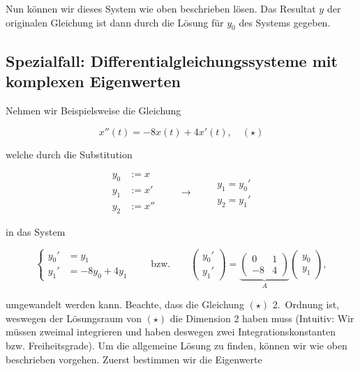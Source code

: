 Nun können wir dieses System wie oben beschrieben lösen. Das Resultat \( y \) der originalen Gleichung ist dann durch die Lösung für \( y_0 \) des Systems gegeben. 

\subsection{Spezialfall: Differentialgleichungssysteme mit komplexen Eigenwerten}

Nehmen wir Beispielsweise die Gleichung 

\begin{equation*}
    x''(t) = -8x(t) + 4x'(t), \quad (\star)
    \label{eq:lin_diff}
\end{equation*}

welche durch die Substitution

\begin{equation*}
    \begin{aligned}
        y_0 &:= x \\
        y_1 &:= x' \\
        y_2 &:= x''         
    \end{aligned} \qquad \longrightarrow \qquad
    \begin{aligned}
        y_1 = y_0' \\
        y_2 = y_1' 
    \end{aligned}
\end{equation*}

in das System 

\begin{equation*}
    \left\{ \begin{aligned}
        y_0' &= y_1 \\
        y_1' &= -8y_0 + 4y_1
    \end{aligned} \right. \qquad \text{bzw.} \qquad
    \begin{pmatrix}
        y_0' \\
        y_1'
    \end{pmatrix} =
    \underbrace{\begin{pmatrix}
        0 & 1 \\
        -8 & 4
    \end{pmatrix}}_{A}
    \begin{pmatrix}
        y_0 \\
        y_1
    \end{pmatrix},
\end{equation*}

umgewandelt werden kann. Beachte, dass die Gleichung \((\star)\) 2.\ Ordnung ist, weswegen der Lösungsraum von \((\star)\) die Dimension 2 haben muss (Intuitiv: Wir müssen zweimal integrieren und haben deswegen zwei Integrationskonstanten bzw. Freiheitsgrade). Um die allgemeine Lösung zu finden, können wir wie oben beschrieben vorgehen. Zuerst bestimmen wir die Eigenwerte

